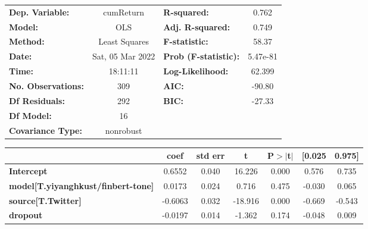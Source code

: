 \begin{center}
\begin{tabular}{lclc}
\toprule
\textbf{Dep. Variable:}                    &    cumReturn     & \textbf{  R-squared:         } &     0.762   \\
\textbf{Model:}                            &       OLS        & \textbf{  Adj. R-squared:    } &     0.749   \\
\textbf{Method:}                           &  Least Squares   & \textbf{  F-statistic:       } &     58.37   \\
\textbf{Date:}                             & Sat, 05 Mar 2022 & \textbf{  Prob (F-statistic):} &  5.47e-81   \\
\textbf{Time:}                             &     18:11:11     & \textbf{  Log-Likelihood:    } &    62.399   \\
\textbf{No. Observations:}                 &         309      & \textbf{  AIC:               } &    -90.80   \\
\textbf{Df Residuals:}                     &         292      & \textbf{  BIC:               } &    -27.33   \\
\textbf{Df Model:}                         &          16      & \textbf{                     } &             \\
\textbf{Covariance Type:}                  &    nonrobust     & \textbf{                     } &             \\
\bottomrule
\end{tabular}
\begin{tabular}{lcccccc}
                                           & \textbf{coef} & \textbf{std err} & \textbf{t} & \textbf{P$> |$t$|$} & \textbf{[0.025} & \textbf{0.975]}  \\
\midrule
\textbf{Intercept}                         &       0.6552  &        0.040     &    16.226  &         0.000        &        0.576    &        0.735     \\
\textbf{model[T.yiyanghkust/finbert-tone]} &       0.0173  &        0.024     &     0.716  &         0.475        &       -0.030    &        0.065     \\
\textbf{source[T.Twitter]}                 &      -0.6063  &        0.032     &   -18.916  &         0.000        &       -0.669    &       -0.543     \\
\textbf{dropout}                           &      -0.0197  &        0.014     &    -1.362  &         0.174        &       -0.048    &        0.009     \\

\end{tabular}
\end{center}
